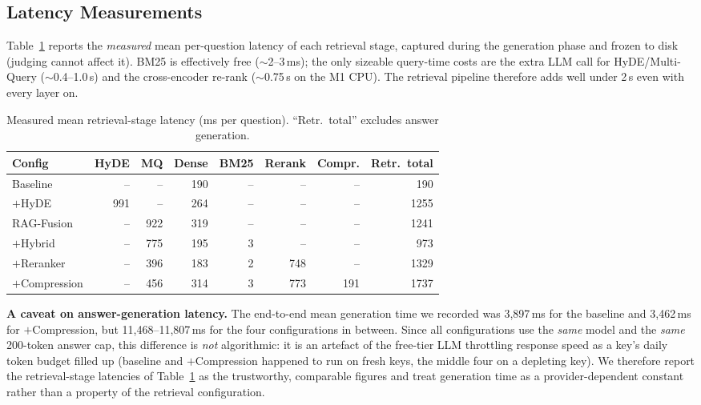 \documentclass[12pt,a4paper]{report}
\begin{document}
\subsection*{Latency Measurements}
Table~\ref{tab:latency} reports the \emph{measured} mean per-question latency of
each retrieval stage, captured during the generation phase and frozen to disk
(judging cannot affect it). BM25 is effectively free ($\sim$2--3\,ms); the only
sizeable query-time costs are the extra LLM call for HyDE/Multi-Query
($\sim$0.4--1.0\,s) and the cross-encoder re-rank ($\sim$0.75\,s on the M1 CPU).
The retrieval pipeline therefore adds well under 2\,s even with every layer on.

\begin{table}[h]
\centering
\caption{Measured mean retrieval-stage latency (ms per question).
``Retr.\ total'' excludes answer generation.}
\label{tab:latency}
\small
\begin{tabular}{@{}lrrrrrrr@{}}
\toprule
\textbf{Config} & \textbf{HyDE} & \textbf{MQ} & \textbf{Dense} & \textbf{BM25} &
\textbf{Rerank} & \textbf{Compr.} & \textbf{Retr.\ total}\\
\midrule
Baseline      & --   & --   & 190 & --  & --   & --   & 190\\
$+$HyDE       & 991  & --   & 264 & --  & --   & --   & 1255\\
RAG-Fusion    & --   & 922  & 319 & --  & --   & --   & 1241\\
$+$Hybrid     & --   & 775  & 195 & 3   & --   & --   & 973\\
$+$Reranker   & --   & 396  & 183 & 2   & 748  & --   & 1329\\
$+$Compression& --   & 456  & 314 & 3   & 773  & 191  & 1737\\
\bottomrule
\end{tabular}
\end{table}

\noindent\textbf{A caveat on answer-generation latency.} The end-to-end mean
generation time we recorded was 3{,}897\,ms for the baseline and 3{,}462\,ms for
$+$Compression, but 11{,}468--11{,}807\,ms for the four configurations in between.
Since all configurations use the \emph{same} model and the \emph{same} 200-token
answer cap, this difference is \emph{not} algorithmic: it is an artefact of the
free-tier LLM throttling response speed as a key's daily token budget filled up
(baseline and $+$Compression happened to run on fresh keys, the middle four on a
depleting key). We therefore report the retrieval-stage latencies of
Table~\ref{tab:latency} as the trustworthy, comparable figures and treat
generation time as a provider-dependent constant rather than a property of the
retrieval configuration.
\end{document}
